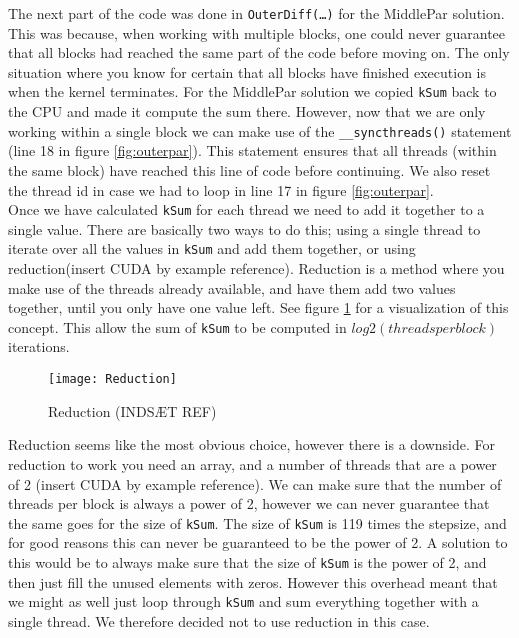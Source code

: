 The next part of the code was done in \texttt{OuterDiff(…)} for the MiddlePar solution. This was because, when working with multiple blocks, one could never guarantee that all blocks had reached the same part of the code before moving on. The only situation where you know for certain that all blocks have finished execution is when the kernel terminates. For the MiddlePar solution we copied \texttt{kSum} back to the CPU and made it compute the sum there. However, now that we are only working within a single block we can make use of the \texttt{\_\_syncthreads()} statement (line 18 in figure \ref{fig:outerpar}). This statement ensures that all threads (within the same block) have reached this line of code before continuing. We also reset the thread id in case we had to loop in line 17 in figure \ref{fig:outerpar}. \\

Once we have calculated \texttt{kSum} for each thread we need to add it together to a single value. There are basically two ways to do this; using a single thread to iterate over all the values in \texttt{kSum} and add them together, or using reduction(insert CUDA by example reference). Reduction is a method where you make use of the threads already available, and have them add two values together, until you only have one value left. See figure \ref{fig:reduction} for a visualization of this concept. This allow the sum of \texttt{kSum} to be computed in $log2(threadsperblock)$ iterations.\\

\begin{figure}[ht!]
  \centering
    \texttt{[image: Reduction]}
  \caption{Reduction (INDSÆT REF)}
  \label{fig:reduction}
\end{figure}

Reduction seems like the most obvious choice, however there is a downside. For reduction to work you need an array, and a number of threads that are a power of 2 (insert CUDA by example reference). We can make sure that the number of threads per block is always a power of 2, however we can never guarantee that the same goes for the size of \texttt{kSum}. The size of \texttt{kSum} is 119 times the stepsize, and for good reasons this can never be guaranteed to be the power of 2. A solution to this would be to always make sure that the size of \texttt{kSum} is the power of 2, and then just fill the unused elements with zeros. However this overhead meant that we might as well just loop through \texttt{kSum} and sum everything together with a single thread. We therefore decided not to use reduction in this case.\\

